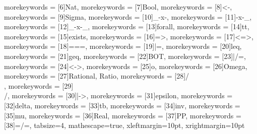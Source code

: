 {    morekeywords = [6]{Nat},
    morekeywords = [7]{Bool},
    morekeywords = [8]{<-},
    morekeywords = [9]{Sigma},
    morekeywords = [10]{_-x-},
    morekeywords = [11]{-x-_},
    morekeywords = [12]{_-x-_},
    morekeywords = [13]{forall},
    morekeywords = [14]{tt},
    morekeywords = [15]{exists},
    morekeywords = [16]{=>},
    morekeywords = [17]{<=>},
    morekeywords = [18]{===},
    morekeywords = [19]{|=},
    morekeywords = [20]{leq},    
    morekeywords = [21]{geq}, 
    morekeywords = [22]{BOT},
    morekeywords = [23]{|/=},
    morekeywords = [24]{<->},
    morekeywords = [25]{o},
    morekeywords = [26]{Omega},
    morekeywords = [27]{Rational, Ratio},
    morekeywords = [28]{/\\},
    morekeywords = [29]{\\/},
    morekeywords = [30]{|->},
    morekeywords = [31]{epsilon},
    morekeywords = [32]{delta},
    morekeywords = [33]{tb},
    morekeywords = [34]{inv},
    morekeywords = [35]{mu},
    morekeywords = [36]{Real},
    morekeywords = [37]{PP},
    morekeywords = [38]{=/=},
    tabsize=4,
    mathescape=true,
    xleftmargin=10pt,
    xrightmargin=10pt
}



\newcommand{\arr}{\rightarrow}
\newcommand{\arrleft}{\leftarrow}
\newcommand{\impl}{\Rightarrow}
\renewcommand{\iff}{\Leftrightarrow}
\newcommand{\fmap}{<\!\!\$\!\!>}


	

\newcommand{\inlcode}[1]{\lstinline[columns=fixed, style = mystyle]|#1|}
\newcommand{\hscode}[1]{\lstinline[columns=fixed, style = haskellStyle]|#1|}
